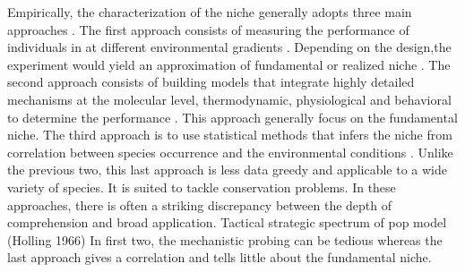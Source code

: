 Empirically, the characterization of the niche generally adopts three main approaches \citep{Holt2009}.
The first approach consists of measuring the performance of  individuals in at different environmental gradients \citep{Birch1953, Elliott1982, Angert2005, Frazier2006}.
Depending on the design,the experiment would yield an approximation of fundamental or realized niche \citep{Birch1953, Elliott1982, Angert2005, Frazier2006}.
The second approach consists of building models that integrate highly detailed mechanisms at the molecular level, thermodynamic, physiological and behavioral to determine  the performance \citep{Kooijman2009, Kearney2009, Buckley2008}.
This approach generally focus on the fundamental niche.
The third approach is to use statistical methods that infers the niche from correlation between species occurrence and the environmental conditions \citep{Guisan2005, Austin2007, Elith2009}. %
Unlike the previous two, this last approach is less data greedy and applicable to a wide variety of species.
It is suited to tackle conservation problems.
In these approaches, there is often a striking discrepancy between the depth of comprehension and broad application.
Tactical strategic spectrum of pop model (Holling 1966)
In first two, the mechanistic probing can be tedious whereas the last approach gives a correlation and tells little about the fundamental niche.

